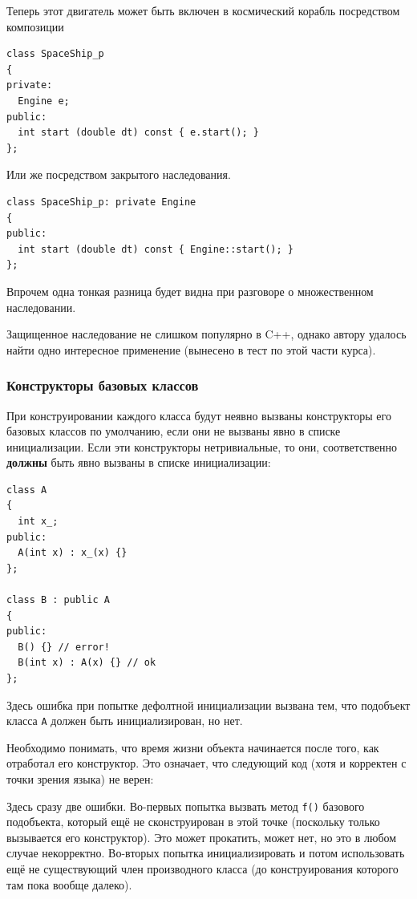 \documentclass[a4paper,12pt,oneside]{article}
\begin{document}
Теперь этот двигатель может быть включен в космический корабль посредством композиции

\begin{lstlisting}
class SpaceShip_p
{
private: 
  Engine e;
public:
  int start (double dt) const { e.start(); } 
};
\end{lstlisting}

Или же посредством закрытого наследования.

\begin{lstlisting}
class SpaceShip_p: private Engine
{
public:
  int start (double dt) const { Engine::start(); }
};
\end{lstlisting}

Впрочем одна тонкая разница будет видна при разговоре о множественном наследовании.

Защищенное наследование не слишком популярно в C++, однако автору удалось найти одно интересное применение (вынесено в тест по этой части курса).

\subsubsection{Конструкторы базовых классов}\label{BaseClassConstr}

При конструировании каждого класса будут неявно вызваны конструкторы его базовых классов по умолчанию, если они не вызваны явно в списке инициализации. Если эти конструкторы нетривиальные, то они, соответственно \textbf{должны} быть явно вызваны в списке инициализации:

\begin{lstlisting}
class A
{
  int x_;
public:
  A(int x) : x_(x) {}
};

class B : public A
{
public:
  B() {} // error!
  B(int x) : A(x) {} // ok
};
\end{lstlisting}

Здесь ошибка при попытке дефолтной инициализации вызвана тем, что подобъект класса \lstinline!A! должен быть инициализирован, но нет.

Необходимо понимать, что время жизни объекта начинается после того, как отработал его конструктор. Это означает, что следующий код (хотя и корректен с точки зрения языка) не верен:



Здесь сразу две ошибки. Во-первых попытка вызвать метод \lstinline!f()! базового подобъекта, который ещё не сконструирован в этой точке (поскольку только вызывается его конструктор). Это может прокатить, может нет, но это в любом случае некорректно. Во-вторых попытка инициализировать и потом использовать ещё не существующий член производного класса (до конструирования которого там пока вообще далеко).
\end{document}

